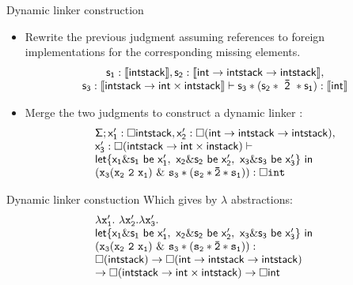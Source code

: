 \documentclass{beamer}
\begin{document}
 \begin{frame} {Dynamic linker construction}
  \begin{itemize}
  \item Rewrite the previous judgment assuming references to foreign implementations for 
  the corresponding missing elements.
\[\begin{array}{c} {\sf s_1:\llbracket intstack\rrbracket, s_2:\llbracket int\rightarrow intstack\rightarrow intstack\rrbracket},\\ {\sf s_3:\llbracket intstack\rightarrow int\times intstack \rrbracket \vdash s_3 * (s_2 * \ \bar{2}\ * s_1):\llbracket int\rrbracket} \end{array} \]
\item Merge the two judgments to construct a dynamic linker :
\[\begin{array}{l} {\sf \Sigma}; {\sf {x_1^{\prime}:\Box intstack ,x_2^{\prime}:\Box(int\rightarrow intstack\rightarrow intstack)}},\\ {\sf x_3^{\prime}: \Box (intstack\rightarrow int\times instack)}\vdash \\ {\sf let\{ x_1\& s_1 {\ \sf be \ } x_1^{\prime}, \ x_2\& s_2 {\ \sf be \ } x_2^{\prime}, \ x_3\& s_3 {\ \sf be \ } x_3^{\prime} \}\ in}\ \\ \mathtt{(x_3 (x_2\ 2 \ x_1)\ \& \ s_3*(s_2* \bar{2}*s_1)):\Box int} \end{array} \]
\end{itemize}
  \end{frame}
  \begin{frame}{Dynamic linker constuction}
     Which gives by $\lambda$ abstractions:\\
  \[\begin{array}{l l} \mathtt{\lambda x_1^{\prime}.\ \lambda x_2^{\prime}. \lambda x_3^{\prime}}. \\ {\sf let\{ x_1\& s_1 {\ \sf be \ } x_1^{\prime}, \ x_2\& s_2 {\ \sf be \ } x_2^{\prime}, \ x_3\& s_3 {\ \sf be \ } x_3^{\prime} \}\ in}\ \\ \mathtt{(x_3 (x_2\ 2 \ x_1)\ \& \ s_3*(s_2* \bar{2}*s_1)):}\\ {\sf \Box(intstack)\rightarrow \Box(int\rightarrow intstack\rightarrow intstack)} \\ {\sf \rightarrow \Box (intstack\rightarrow int\times intstack) \rightarrow \Box int} \end{array} \]  
 
\end{frame} 
\end{document}
